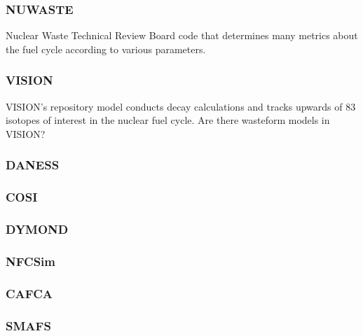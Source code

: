 \subsubsection{NUWASTE} Nuclear Waste Technical Review Board code that 
determines many metrics about the fuel cycle according to various 
parameters. \cite{ abkowitz_nuclear_2010}

\subsubsection{VISION}
VISION's repository model conducts decay calculations and tracks 
upwards of 83 isotopes of interest in the nuclear fuel cycle.  
\cite{yacout_visionverifiable_2006} Are there wasteform models in VISION?
\subsubsection{DANESS}
\subsubsection{COSI}
\subsubsection{DYMOND}
\subsubsection{NFCSim}
\subsubsection{CAFCA}
\subsubsection{SMAFS}
